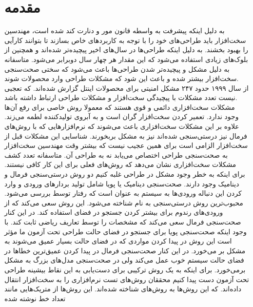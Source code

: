 \documentclass[conference]{IEEEtran}
\begin{document}
\section{مقدمه}
به دلیل اینکه پیشرفت به واسطه قانون مور و دنارت کند شده است، مهندسین سخت‌افزار
باید طراحی‌های خود را با توجه به کاربرد‌های خاص بسازند تا بتوانند کارآیی را بهبود بخشند.
به دلیل اینکه طراحی‌ها در سال‌های اخیر پیچیده‌تر شده‌اند و همچنین از بلوک‌های
زیادی استفاده می‌شود که این مقدار هر چهار سال دوبرابر می‌شود. \cite{b1}
متاسفانه به دلیل مشکل
و پیچیده‌تر شدن طراحی‌ها باعث می‌شود که سختی صحت‌سنجی سخت‌افزار بیشتر شده
و باعث این شود که مشکلات طراحی وارد محصولات شوند. \\
از سال ۱۹۹۹ حدود ۲۴۷ مشکل امنیتی برای محصولات اینتل گزارش شده‌اند.
\cite{b2}
که تعجبی نیست تعدد مشکلات
با پیچیدگی سخت‌افزار و مشکلات طراحی ارتباط داشته باشد. \\
مشکلات سخت‌افزاری دائمی و قوی هستند که معمولا روش خاصی برای رفع آن‌ها وجود ندارد.
تعمیر کردن سخت‌افزار گران است و به آبروی تولید‌کننده لطمه می‌زند.
علاوه‌ بر این مشکلات سخت‌افزاری باعث می‌شوند که نرم‌افزار‌هایی که با روش‌های فرمال نیز
درستی‌سنجی شده‌اند نیز به مشکل بربخورند.
شناسایی این مشکلات قبل از
سخت‌افزار الزامی است برای همین عجیب نیست که بیشتر وقت مهندسین سخت‌افزار به صحت‌سنجی
طراحی اختصاص می‌یابد نه به طراحی آن.
متاسفانه تعدد کشف مشکلات سخت‌افزاری نشان می‌دهد که روش‌های فعلی برای این کار کافی نیستند.
برای اینکه به خطر وجود مشکل در طراحی غلبه کنیم دو روش درستی‌سنجی فرمال و دینامیک
وجود دارند.
صحت‌سنجی دینامیک یا پویا شامل تولید بردار‌های ورودی و وارد کردن این دنباله ورودی‌ها به سیستم
به عنوان
است که رفتار
توسط
بررسی می‌شود.
محبوب‌ترین روش درستی‌سنجی به نام
شناخته می‌شود.
این روش سعی می‌کند که از ورودی‌های رندوم برای بیشتر کردن جستجو در فضای
استفاده کند.
در این کنار صحت‌سنجی فرمال سعی می‌کند که مشخصات
را توسط تعاریف ریاضی ثابت کند.
با وجود اینکه صحت‌سنجی پویا برای جستجو در فضای حالت طراحی تحت آزمون ما مؤثر است
این روش در پیدا کردن مواردی که در فضای حالت بسیار عمیق می‌شوند به مشکل بر می‌خورد.
در این کنار صحت‌سنجی فرمال در پیدا کردن عمیق‌ترین خطا‌ها در فضای حالت سیستم خوب عمل می‌کند
ولی در صحت‌سنجی مدل‌های بزرگ به مشکل برمی‌خورد.
برای اینکه به یک روش ترکیبی برای دست‌یابی به این نقاط بیشینه طراحی تحت آزمون دست پیدا کنیم
محققان روش‌های تست نرم‌افزاری را به سخت‌افزار انتقال داده‌اند.
که این روش‌ها به روش‌های
شناخته شده‌اند.
این روش‌ها از متریک‌هایی مانند تعداد خط نوشته شده
\end{document}

